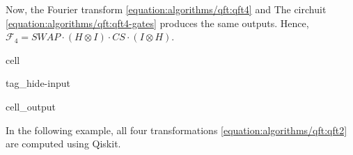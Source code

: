 \documentclass[letterpaper,10pt,english]{jupyterBook}
\begin{document}
\sphinxAtStartPar
Now, the Fourier transform \eqref{equation:algorithms/qft:qft4} and The circhuit \eqref{equation:algorithms/qft:qft4-gates} produces the same outputs.  Hence, \(\mathcal{F}_4 = SWAP \cdot (H \otimes I) \cdot CS \cdot (I \otimes H)\).

\begin{sphinxuseclass}{cell}
\begin{sphinxuseclass}{tag_hide-input}\begin{sphinxVerbatimOutput}

\begin{sphinxuseclass}{cell_output}
\noindent{}

\end{sphinxuseclass}\end{sphinxVerbatimOutput}

\end{sphinxuseclass}
\end{sphinxuseclass}
\sphinxAtStartPar
In the following example, all four transformations \eqref{equation:algorithms/qft:qft2} are computed using Qiskit.
\end{document}
